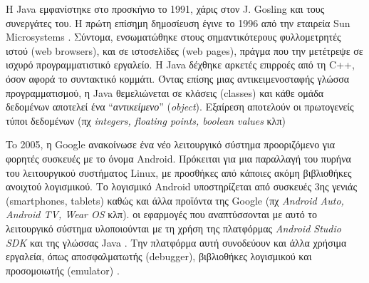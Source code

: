 Η Java εμφανίστηκε στο προσκήνιο το 1991, χάρις στον J. Gosling και τους συνεργάτες του. Η πρώτη επίσημη δημοσίευση έγινε το 1996 από την εταιρεία Sun Microsystems \cite{[JAVA8]}. Σύντομα, ενσωματώθηκε στους σημαντικότερους φυλλομετρητές ιστού (web browsers), και σε ιστοσελίδες (web pages), πράγμα που την μετέτρεψε σε ισχυρό προγραμματιστικό εργαλείο. Η Java δέχθηκε αρκετές επιρροές από τη C++, όσον αφορά το συντακτικό κομμάτι. Όντας επίσης μιας αντικειμενοσταφής γλώσσα προγραμματισμού, η Java θεμελιώνεται σε κλάσεις (classes) και κάθε ομάδα δεδομένων αποτελεί ένα ``\textit{αντικείμενο}'' (\textit{object}). Εξαίρεση αποτελούν οι πρωτογενείς τύποι δεδομένων (πχ \textit{integers, floating points, boolean values} κλπ)

To 2005, η Google ανακοίνωσε ένα νέο λειτουργικό σύστημα προοριζόμενο για φορητές συσκευές με το όνομα Android. Πρόκειται για μια παραλλαγή του πυρήνα του λειτουργικού συστήματος Linux, με προσθήκες από κάποιες ακόμη βιβλιοθήκες ανοιχτού λογισμικού. Το λογισμικό Android υποστηρίζεται από συσκευές 3ης γενιάς (smartphones, tablets) καθώς και άλλα προϊόντα της Google (πχ \textit{Android Auto, Android TV, Wear OS} κλπ). οι εφαρμογές που αναπτύσσονται με αυτό το λειτουργικό σύστημα υλοποιούνται με τη χρήση της πλατφόρμας \textit{Android Studio SDK} \cite{[JAVA9]} και της γλώσσας Java \cite{[JAVA10]}. Την πλατφόρμα αυτή συνοδεύουν και άλλα χρήσιμα εργαλεία, όπως αποσφαλματωτής (debugger), βιβλιοθήκες λογισμικού και προσομοιωτής (emulator) \cite{[JAVA11]}.

